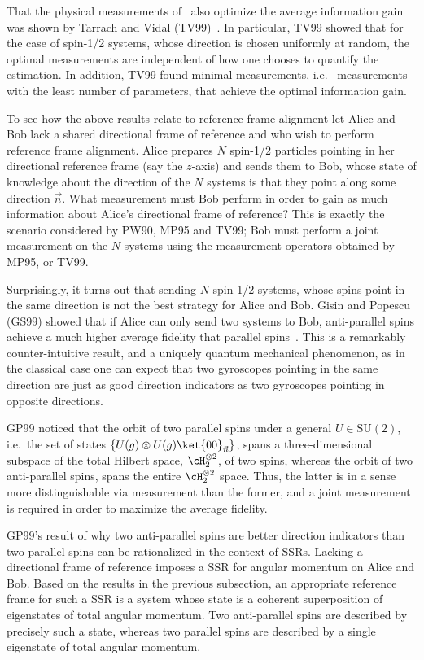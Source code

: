 That the physical measurements of~\cite{DBE98} also optimize the average information gain was shown by Tarrach and Vidal (TV99)~\cite{TV99}.  In particular, TV99 showed that for the case of spin-1/2 systems, whose direction is chosen uniformly at random, the optimal measurements are independent of how one chooses to quantify the estimation.  In addition, TV99 found minimal measurements, i.e.~ measurements with the least number of parameters, that achieve the optimal information gain.  

To see how the above results relate to reference frame alignment let Alice and Bob lack a shared directional frame of reference and who wish to perform reference frame alignment. Alice prepares $N$ spin-1/2 particles pointing in her directional reference frame (say the $z$-axis) and sends them to Bob, whose state of knowledge about the direction of the $N$ systems is that they point along some direction $\vec{n}$.  What measurement must Bob perform in order to gain as much information about Alice's directional frame of reference?  This is exactly the scenario considered by PW90, MP95 and TV99;  Bob must perform a joint measurement on the $N$-systems using the measurement operators obtained by MP95, or TV99.

Surprisingly, it turns out that sending $N$ spin-1/2 systems, whose spins point in the same direction is not the best strategy for Alice and Bob.  Gisin and Popescu (GS99) showed that if Alice can only send two systems to Bob, anti-parallel spins achieve a much higher average fidelity that parallel spins~\cite{GS99}.  This is a remarkably counter-intuitive result, and a uniquely quantum mechanical phenomenon, as in the classical case one can expect that two gyroscopes pointing in the same direction are just as good direction indicators as two gyroscopes pointing in opposite directions.  

GP99 noticed that the orbit of two parallel spins under a general $U\in\mathrm{SU}(2)$, i.e.~the set of states $\{U(g)\otimes U(g)\ket{00}_{\vec{n}}\}$, spans a three-dimensional subspace of the total Hilbert space, $\cH_2^{\otimes 2}$, of two spins, whereas the orbit of two anti-parallel spins, spans the entire $\cH_2^{\otimes 2}$ space.  Thus, the latter is in a sense more distinguishable via measurement than the former, and a joint measurement is required in order to maximize the average fidelity. 

GP99's result of why two anti-parallel spins are better direction indicators than two parallel spins can be rationalized in the context of SSRs.  Lacking a directional frame of reference imposes a SSR for angular momentum on Alice and Bob.  Based on the results in the previous subsection, an appropriate reference frame for such a SSR is a system whose state is a coherent superposition of eigenstates of total angular momentum.  Two anti-parallel spins are described by precisely such a state, whereas two parallel spins are described by a single eigenstate of total angular momentum.

